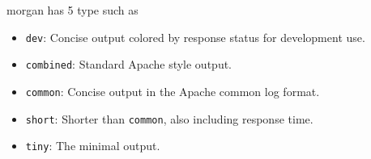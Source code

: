 morgan has 5 type such as
    \begin{itemize}
        \item \texttt{dev}: Concise output colored by response status for development use.
        \item \texttt{combined}: Standard Apache style output.
        \item \texttt{common}: Concise output in the Apache common log format.
        \item \texttt{short}: Shorter than \texttt{common}, also including response time.
        \item \texttt{tiny}: The minimal output.
    \end{itemize}